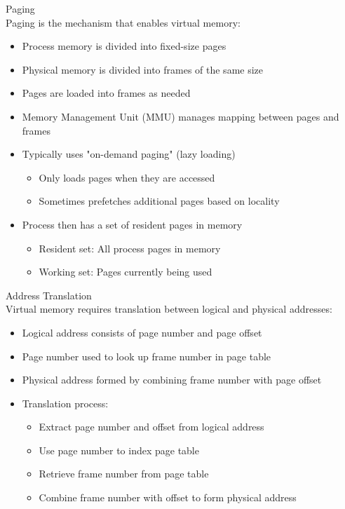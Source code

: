\begin{definition}{Paging}\\
    Paging is the mechanism that enables virtual memory:
    \begin{itemize}
        \item Process memory is divided into fixed-size pages
        \item Physical memory is divided into frames of the same size
        \item Pages are loaded into frames as needed
        \item Memory Management Unit (MMU) manages mapping between pages and frames
        \item Typically uses "on-demand paging" (lazy loading)
            \begin{itemize}
                \item Only loads pages when they are accessed
                \item Sometimes prefetches additional pages based on locality
            \end{itemize}
        \item Process then has a set of resident pages in memory
            \begin{itemize}
                \item Resident set: All process pages in memory
                \item Working set: Pages currently being used
            \end{itemize}
    \end{itemize}
\end{definition}

\begin{definition}{Address Translation}\\
    Virtual memory requires translation between logical and physical addresses:
    \begin{itemize}
        \item Logical address consists of page number and page offset
        \item Page number used to look up frame number in page table
        \item Physical address formed by combining frame number with page offset
        \item Translation process:
            \begin{itemize}
                \item Extract page number and offset from logical address
                \item Use page number to index page table
                \item Retrieve frame number from page table
                \item Combine frame number with offset to form physical address
            \end{itemize}
    \end{itemize}
\end{definition}

